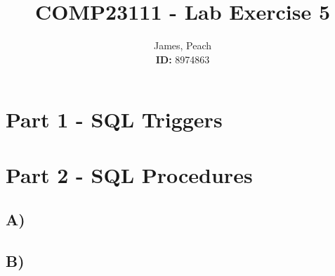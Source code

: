 \documentclass[11pt,a4paper]{article}
\newcommand{\includesqloutput}[1]{\tiny  \normalsize}
\begin{document}
\title{\textbf{COMP23111} - Lab Exercise 5}

\author{James, Peach \\ \textbf{ID:} 8974863} 


\maketitle
\thispagestyle{empty} %
\newpage %

\section{Part 1 - SQL Triggers}


\includesqloutput{sqlOutputs/LabEx5Part1Out.lst}

\section{Part 2 - SQL Procedures}

\subsection{A) }
\includesqloutput{sqlOutputs/LabEx5Part2Out.lst}
\subsection{B) }
\includesqloutput{sqlOutputs/LabEx5Part2.1Out.lst}
\end{document}
